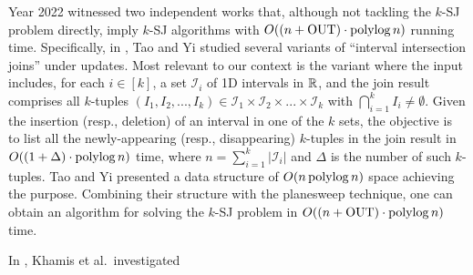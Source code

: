 \documentclass[sigconf]{acmart}
\def\vgap{\vspace{0mm}}
\def\I{\mathcal{I}}
\def\out{\mathrm{OUT}}
\begin{document}
\vgap

Year 2022 witnessed two independent works \cite{ty22,kcko22} that, although not tackling the $k$-SJ problem directly, imply $k$-SJ algorithms with $O((n + \out) \cdot \polylog n)$ running time. Specifically, in \cite{ty22}, Tao and Yi studied several variants of ``interval intersection joins'' under updates. Most relevant to our context is the variant where the input includes, for each $i \in [k]$, a set $\I_i$ of 1D intervals in $\mathbb{R}$, and the join result comprises all $k$-tuples $(I_1, I_2, ..., I_k) \in \I_1 \times \I_2 \times ... \times \I_k$ with $\bigcap_{i=1}^k I_i \neq \emptyset$. Given the insertion (resp., deletion) of an interval in one of the $k$ sets, the objective is to list all the newly-appearing (resp., disappearing) $k$-tuples in the join result in $O((1+\Delta) \cdot \operatorname*{polylog} n)$ time, where $n = \sum_{i=1}^k |\I_i|$ and $\Delta$ is the number of such $k$-tuples. Tao and Yi \cite{ty22} presented a data structure of $O(n \operatorname*{polylog} n)$ space achieving the purpose. Combining their structure with the planesweep technique, one can obtain an algorithm for solving the $k$-SJ problem in $O((n + \out) \cdot \polylog n)$ time.

\vgap

In \cite{kcko22}, Khamis et al.\ investigated



\balance

\end{document}
